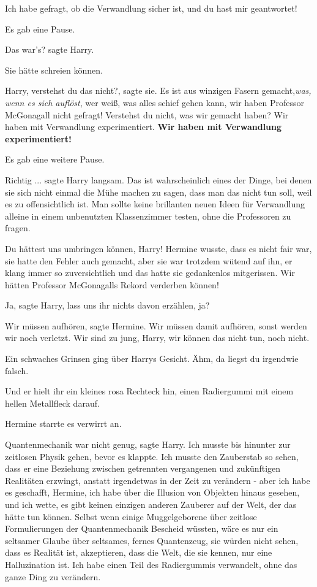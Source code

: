 \glqq{}Ich habe gefragt, ob die Verwandlung sicher ist, und du hast mir
geantwortet!\grqq{}

Es gab eine Pause.

\glqq{}Das war's?\grqq{} sagte Harry.

Sie hätte schreien können.

\glqq{}Harry, verstehst du das nicht?\grqq{}, sagte sie. \glqq{}Es ist aus
winzigen Fasern gemacht,\emph{was, wenn es sich auflöst}, wer weiß, was alles
schief gehen kann, wir haben Professor McGonagall nicht gefragt! Verstehst du
nicht, was wir gemacht haben? Wir haben mit Verwandlung experimentiert.
\textbf{Wir haben mit Verwandlung experimentiert!}\grqq{}

Es gab eine weitere Pause.

\glqq{}Richtig ...\grqq{} sagte Harry langsam. \glqq{} Das ist wahrscheinlich
eines der Dinge, bei denen sie sich nicht einmal die Mühe machen zu sagen, dass
man das nicht tun soll, weil es zu offensichtlich ist. Man sollte keine
brillanten neuen Ideen für Verwandlung alleine in einem unbenutzten
Klassenzimmer testen, ohne die Professoren zu fragen.\grqq{}

\glqq{}Du hättest uns umbringen können, Harry!\grqq{} Hermine wusste, dass es
nicht fair war, sie hatte den Fehler auch gemacht, aber sie war trotzdem wütend
auf ihn, er klang immer so zuversichtlich und das hatte sie gedankenlos
mitgerissen. \glqq{}Wir hätten Professor McGonagalls Rekord verderben
können!\grqq{}

\glqq{}Ja\grqq{}, sagte Harry, \glqq{}lass uns ihr nichts davon erzählen,
ja?\grqq{}

\glqq{}Wir müssen aufhören\grqq{}, sagte Hermine. \glqq{}Wir müssen damit
aufhören, sonst werden wir noch verletzt. Wir sind zu jung, Harry, wir können
das nicht tun, noch nicht.\grqq{}

Ein schwaches Grinsen ging über Harrys Gesicht. \glqq{}Ähm, da liegst du
irgendwie falsch.\grqq{}

Und er hielt ihr ein kleines rosa Rechteck hin, einen Radiergummi mit einem
hellen Metallfleck darauf.

Hermine starrte es verwirrt an.

\glqq{}Quantenmechanik war nicht genug\grqq{}, sagte Harry. \glqq{}Ich musste
bis hinunter zur zeitlosen Physik gehen, bevor es klappte. Ich musste den
Zauberstab so sehen, dass er eine Beziehung zwischen getrennten vergangenen und
zukünftigen Realitäten erzwingt, anstatt irgendetwas in der Zeit zu verändern -
aber ich habe es geschafft, Hermine, ich habe über die Illusion von Objekten
hinaus gesehen, und ich wette, es gibt keinen einzigen anderen Zauberer auf der
Welt, der das hätte tun können. Selbst wenn einige Muggelgeborene über zeitlose
Formulierungen der Quantenmechanik Bescheid wüssten, wäre es nur ein seltsamer
Glaube über seltsames, fernes Quantenzeug, sie würden nicht sehen, dass es
Realität ist, akzeptieren, dass die Welt, die sie kennen, nur eine Halluzination
ist. Ich habe einen Teil des Radiergummis verwandelt, ohne das ganze Ding zu
verändern.\grqq{}

